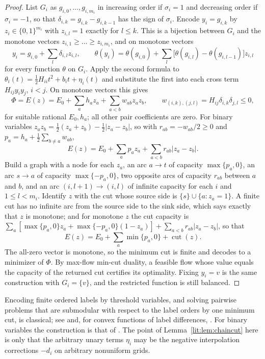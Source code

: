 \begin{proof}
List $G_i$ as $g_{i,0},\dots,g_{i,m_i}$ in increasing order if $\sigma_i=1$ and decreasing order
if $\sigma_i=-1$, so that $\delta_{i,k}=g_{i,k}-g_{i,k-1}$ has the sign of $\sigma_i$. Encode
$y_i=g_{i,k}$ by $z_i\in\{0,1\}^{m_i}$ with $z_{i,l}=1$ exactly for $l\le k$. This is a bijection
between $G_i$ and the monotone vectors $z_{i,1}\ge\dots\ge z_{i,m_i}$, and on monotone vectors
\[
y_i=g_{i,0}+\sum_l\delta_{i,l}z_{i,l},\qquad
\theta(y_i)=\theta(g_{i,0})+\sum_l\bigl[\theta(g_{i,l})-\theta(g_{i,l-1})\bigr]z_{i,l}
\]
for every function $\theta$ on $G_i$. Apply the second formula to
$\theta_i(t)=\tfrac12H_{ii}t^2+b_it+\eta_i(t)$ and substitute the first into each cross term
$H_{ij}y_iy_j$, $i<j$. On monotone vectors this gives
\[
\Phi=E(z)=E_0+\sum_ah_az_a+\sum_{a<b}w_{ab}z_az_b,\qquad
w_{(i,k),(j,l)}=H_{ij}\delta_{i,k}\delta_{j,l}\le0,
\]
for suitable rational $E_0,h_a$; all other pair coefficients are zero. For binary
variables $z_az_b=\tfrac12(z_a+z_b)-\tfrac12|z_a-z_b|$, so with $r_{ab}=-w_{ab}/2\ge0$ and
$p_a=h_a+\tfrac12\sum_{b\neq a}w_{ab}$,
\[
E(z)=E_0+\sum_ap_az_a+\sum_{a<b}r_{ab}|z_a-z_b|.
\]
Build a graph with a node for each $z_a$, an arc $a\to t$ of capacity $\max\{p_a,0\}$, an arc
$s\to a$ of capacity $\max\{-p_a,0\}$, two opposite arcs of capacity $r_{ab}$ between $a$ and
$b$, and an arc $(i,l+1)\to(i,l)$ of infinite capacity for each $i$ and $1\le l<m_i$. Identify
$z$ with the cut whose source side is $\{s\}\cup\{a:z_a=1\}$. A finite cut has no
infinite arc from the source side to the sink side, which says exactly that $z$ is monotone; and
for monotone $z$ the cut capacity is
$\sum_a[\max\{p_a,0\}z_a+\max\{-p_a,0\}(1-z_a)]+\sum_{a<b}r_{ab}|z_a-z_b|$, so that
\[
E(z)=E_0+\sum_a\min\{p_a,0\}+\operatorname{cut}(z).
\]
The all-zero vector is monotone, so the minimum cut is finite and decodes to a minimizer of
$\Phi$. By max-flow min-cut duality, a feasible flow whose value equals the capacity of the
returned cut certifies its optimality. Fixing $y_i=v$ is the same construction with $G_i=\{v\}$,
and the restricted function is still balanced.
\end{proof}

\begin{remark}
Encoding finite ordered labels by threshold variables, and solving pairwise problems that are
submodular with respect to the label orders by one minimum cut, is classical; see
\cite[Section~4]{SchlesingerFlach2006} and, for convex functions of label differences,
\cite{Ishikawa2003}. For binary variables the construction is that of
\cite{Ivanescu1965,PicardRatliff1975,KolmogorovZabih2004}. The point of
Lemma~\ref{lit:lem:chaincut} here is only that the arbitrary unary terms $\eta_i$ may be the
negative interpolation corrections $-d_i$ on arbitrary nonuniform grids.
\end{remark}

